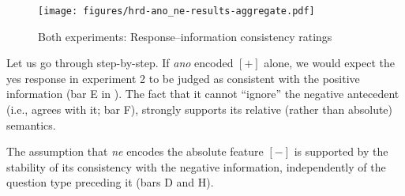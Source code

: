 \documentclass[output=paper,colorlinks,citecolor=brown]{langscibook}
\begin{document}
\begin{figure}
    \texttt{[image: figures/hrd-ano\_ne-results-aggregate.pdf]}
    \caption{Both experiments: Response--information consistency ratings}
    \label{hrdsim:fig:agg}
\end{figure}

Let us go through  step-by-step. If \textit{ano} encoded $[+]$ alone, we would expect the \textsf{yes} response in experiment 2 to be judged as consistent with the positive information (bar E in ). The fact that it cannot ``ignore'' the negative antecedent (i.e., agrees with it; bar F), strongly supports its relative (rather than absolute) semantics.

The assumption that \textit{ne} encodes the absolute feature $[-]$ is supported by the stability of its consistency with the negative information, independently of the question type preceding it (bars D and H).
\end{document}
